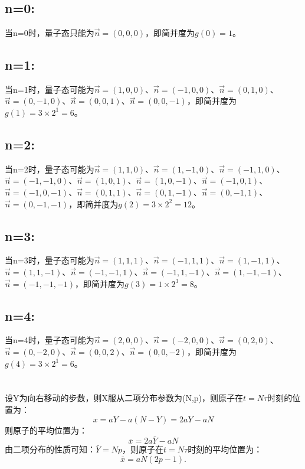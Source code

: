 \documentclass[a4paper,12pt]{article}
\begin{document}
\section{}
\subsection{n=0:}
当n=0时，量子态只能为$\vec{n} = (0,0,0)$，即简并度为$g(0) = 1$。
\subsection{n=1:}
当n=1时，量子态可能为$\vec{n} = (1,0,0)$、$\vec{n} = (-1,0,0)$、$\vec{n} = (0,1,0)$、$\vec{n} = (0,-1,0)$、$\vec{n} = (0,0,1)$、$\vec{n} = (0,0,-1)$，即简并度为$g(1) = 3 \times 2^1 = 6$。
\subsection{n=2:}
当n=2时，量子态可能为$\vec{n} = (1,1,0)$、$\vec{n} = (1,-1,0)$、$\vec{n} = (-1,1,0)$、$\vec{n} = (-1,-1,0)$、$\vec{n} = (1,0,1)$、$\vec{n} = (1,0,-1)$、$\vec{n} = (-1,0,1)$、$\vec{n} = (-1,0,-1)$、$\vec{n} = (0,1,1)$、$\vec{n} = (0,1,-1)$、$\vec{n} = (0,-1,1)$、$\vec{n} = (0,-1,-1)$，即简并度为$g(2) = 3 \times 2^2 = 12$。
\subsection{n=3:}
当n=3时，量子态可能为$\vec{n} = (1,1,1)$、$\vec{n} = (-1,1,1)$、$\vec{n} = (1,-1,1)$、$\vec{n} = (1,1,-1)$、$\vec{n} = (-1,-1,1)$、$\vec{n} = (-1,1,-1)$、$\vec{n} = (1,-1,-1)$、$\vec{n} = (-1,-1,-1)$，即简并度为$g(3) = 1 \times 2^3 = 8$。
\subsection{n=4:}
当n=4时，量子态可能为$\vec{n} = (2,0,0)$、$\vec{n} = (-2,0,0)$、$\vec{n} = (0,2,0)$、$\vec{n} = (0,-2,0)$、$\vec{n} = (0,0,2)$、$\vec{n} = (0,0,-2)$，即简并度为$g(4) = 3 \times 2^1 = 6$。


\section{}
\subsection{}
设Y为向右移动的步数，则X服从二项分布参数为(N,p)，则原子在$t = N \tau$时刻的位置为：
\begin{equation}\nonumber
	x = aY-a(N-Y) = 2aY - aN
\end{equation}
则原子的平均位置为：
\begin{equation}\nonumber
	\bar{x} = 2a\bar{Y} - aN
\end{equation}
由二项分布的性质可知：$\bar{Y} = Np$，则原子在$t = N\tau$时刻的平均位置为：
\begin{equation}\nonumber
	\bar{x} = aN(2p - 1).
\end{equation}
\end{document}
